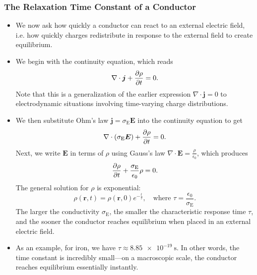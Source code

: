 \documentclass[11pt, a4paper]{article}
\renewcommand{\vec}[1]{\bm{#1}} %
\renewcommand{\r}{\vec{r}}
\newcommand{\E}{\vec{E}} %
\newcommand{\ee}{\epsilon_{0}}  %
\renewcommand{\j}{\vec{j}}  %
\renewcommand{\div}{\nabla \cdot}
\begin{document}
\subsubsection{The Relaxation Time Constant of a Conductor}
\begin{itemize}
	\item We now ask how quickly a conductor can react to an external electric field, i.e. how quickly charges redistribute in response to the external field to create equilibrium. 
	
	\item We begin with the continuity equation, which reads
	\begin{equation*}
		\div \j + \pdv{\rho}{t} = 0.
	\end{equation*}
	Note that this is a generalization of the earlier expression $ \div \j = 0 $ to electrodynamic situations involving time-varying charge distributions. 
	
	\item We then substitute Ohm's law $ \j = \sigma_{\mathrm{E}}\E $ into the continuity equation to get
	\begin{equation*}
		\div (\sigma_{\mathrm{E}} \E) + \pdv{\rho}{t} = 0.
	\end{equation*}
	Next, we write $ \E $ in terms of $ \rho $ using Gauss's law $ \div \E = \frac{\rho}{\ee} $, which produces
	\begin{equation*}
		\pdv{\rho}{t} + \frac{\sigma_{\mathrm{E}}}{\ee} \rho = 0.
	\end{equation*}
	The general solution for $ \rho $ is exponential:
	\begin{equation*}
        \rho(\r, t) = \rho(\r, 0)e^{-\frac{t}{\tau}}, \quad \text{where } \tau = \frac{\ee}{\sigma_{\text{E}}}.
	\end{equation*}
	The larger the conductivity $ \sigma_{\mathrm{E}} $, the smaller the characteristic response time $ \tau $, and the sooner the conductor reaches equilibrium when placed in an external electric field. 
	
	\item As an example, for iron, we have $ \tau \approx \SI{8.85e-19}{\second} $. In other words, the time constant is incredibly small---on a macroscopic scale, the conductor reaches equilibrium essentially instantly.
	
\end{itemize}
\end{document}
